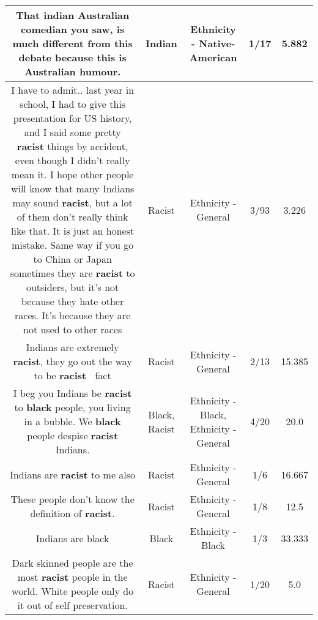 \documentclass[11pt]{article}
\newlength\mylength
\begin{document}
\begin{center}
\begin{longtable}{|C{.65\mylength}|C{.30\mylength}|C{.12\mylength}|C{.12\mylength}|C{.12\mylength}|}
  \small That \textbf{indian} Australian comedian you saw, is much different from this debate because this is Australian humour.\normalsize   & Indian & Ethnicity - Native-American & 1/17 & 5.882 \\  \hline
  \small I have to admit.. last year in school, I had to give this presentation for US history, and I said some pretty \textbf{racist} things by accident, even though I didn't really mean it. I hope other people will know that many Indians may sound \textbf{racist}, but a lot of them don't really think like that. It is just an honest mistake. Same way if you go to China or Japan sometimes they are \textbf{racist} to outsiders, but it's not because they hate other races. It's because they are not used to other races\normalsize   & Racist & Ethnicity - General & 3/93 & 3.226 \\  \hline
  \small Indians are extremely \textbf{racist}, they go out the way to be \textbf{racist} 🤔🤨fact\normalsize   & Racist & Ethnicity - General & 2/13 & 15.385 \\  \hline
  \small I beg you Indians be \textbf{racist} to \textbf{black} people, you living in a bubble. We \textbf{black} people despise \textbf{racist} Indians.\normalsize   & Black, Racist & Ethnicity - Black, Ethnicity - General & 4/20 & 20.0 \\  \hline
  \small Indians are \textbf{racist} to me also\normalsize   & Racist & Ethnicity - General & 1/6 & 16.667 \\  \hline
  \small These people don't know the definition of \textbf{racist}.\normalsize   & Racist & Ethnicity - General & 1/8 & 12.5 \\  \hline
  \small Indians are black\normalsize   & Black & Ethnicity - Black & 1/3 & 33.333 \\  \hline
  \small Dark skinned people are the most \textbf{racist} people in the world.  White people only do it out of self preservation.\normalsize   & Racist & Ethnicity - General & 1/20 & 5.0 \\  \hline

\end{longtable}
\end{center}
\end{document}
